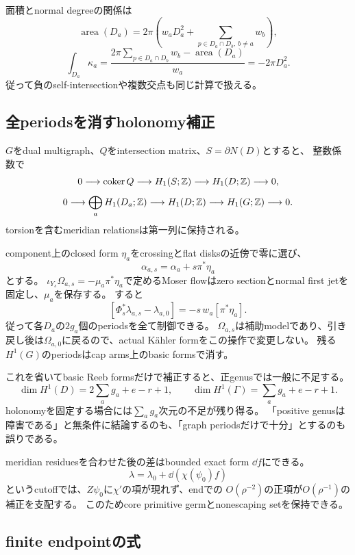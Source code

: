 \documentclass[11pt,a4paper]{article}
\begin{document}
面積とnormal degreeの関係は
\[
 \operatorname{area}(D_a)
 =2\pi\left(w_aD_a^2+\sum_{p\in D_a\cap D_b,\ b\ne a}w_b\right),
\]
\[
 \int_{D_a}\kappa_a
 =\frac{2\pi\sum_{p\in D_a\cap D_b}w_b-\operatorname{area}(D_a)}{w_a}
 =-2\pi D_a^2.
\]
従って負のself-intersectionや複数交点も同じ計算で扱える。

\subsection{全periodsを消すholonomy補正}

$G$をdual multigraph、$Q$をintersection matrix、$S=\partial N(D)$とすると、
整数係数で
\[
0\longrightarrow\operatorname{coker}Q
\longrightarrow H_1(S;\mathbb Z)\longrightarrow H_1(D;\mathbb Z)\longrightarrow0,
\]
\[
0\longrightarrow\bigoplus_aH_1(D_a;\mathbb Z)
\longrightarrow H_1(D;\mathbb Z)\longrightarrow H_1(G;\mathbb Z)\longrightarrow0.
\]
torsionを含むmeridian relationsは第一列に保持される。

component上のclosed form $\eta_a$をcrossingとflat disksの近傍で零に選び、
\[
 \alpha_{a,s}=\alpha_a+s\pi^*\eta_a
\]
とする。
$\iota_{Y_s}\Omega_{a,s}=-\mu_a\pi^*\eta_a$で定めるMoser flowはzero sectionとnormal first jetを固定し、$\mu_a$を保存する。
すると
\[
 [\Phi_s^*\lambda_{a,s}-\lambda_{a,0}]
 =-s\,w_a[\pi^*\eta_a].
\]
従って各$D_a$の$2g_a$個のperiodsを全て制御できる。
$\Omega_{a,s}$は補助modelであり、引き戻し後は$\Omega_{a,0}$に戻るので、actual Kähler formをこの操作で変更しない。
残る$H^1(G)$のperiodsはcap arms上のbasic formsで消す。

これを省いてbasic Reeb formsだけで補正すると、正genusでは一般に不足する。
\[
 \dim H^1(D)=2\sum_ag_a+e-r+1,\qquad
 \dim H^1(\Gamma)=\sum_ag_a+e-r+1.
\]
holonomyを固定する場合には$\sum_ag_a$次元の不足が残り得る。
「positive genusは障害である」と無条件に結論するのも、「graph periodsだけで十分」とするのも誤りである。

meridian residuesを合わせた後の差はbounded exact form $\dd f$にできる。
\[
 \lambda=\lambda_0+\dd(\chi(\psi_0)f)
\]
というcutoffでは、$Z\psi_0$に$\chi'$の項が現れず、endでの
$O(\rho^{-2})$の正項が$O(\rho^{-1})$の補正を支配する。
このためcore primitive germとnonescaping setを保持できる。

\subsection{finite endpointの式}
\end{document}
